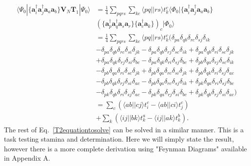 \documentclass[graybox,sectrefs,envcountresetchap,open=right]{svmonodo}
\begin{document}
\begin{align}
\langle \Psi_{0} | \{\mathbf{a}^{\dagger}_i \mathbf{a}^{\dagger}_j \mathbf{a}_a \mathbf{a}_b\}  \mathbf{V}_N \mathbf{T}_1 | \Psi_0 \rangle & = 
\frac{1}{4}
\sum_{pqrs}
\sum_{kc}
\langle pq|| rs \rangle t_k^c \langle \Phi_0 | \{
\mathbf{a}^{\dagger}_i
\mathbf{a}^{\dagger}_j
\mathbf{a}_a
\mathbf{a}_b \} \nonumber \\ & 
\left(
\{
\mathbf{a}^{\dagger}_p
\mathbf{a}^{\dagger}_q
\mathbf{a}_s
\mathbf{a}_r
\}
\{
\mathbf{a}^{\dagger}_c
\mathbf{a}_k
\}
\right)_c | \Phi_0 \rangle
\nonumber \\ & = 
\frac{1}{4} \sum_{pqrs} \sum_{kc} \langle pq||rs\rangle t_k^c ( \delta_{pa} \delta_{qb} \delta_{rc} \delta_{sj} \delta_{ik}  \nonumber \\ & 
- \delta_{pa} \delta_{qb} \delta_{rc} \delta_{si} \delta_{jk}
- \delta_{pa} \delta_{qb} \delta_{rj} \delta_{sc} \delta_{ik}
+ \delta_{pa} \delta_{qb} \delta_{ri} \delta_{sc} \delta_{jk}
\nonumber \\ & 
+ \delta_{pa} \delta_{qk} \delta_{rj} \delta_{si} \delta_{bc}
- \delta_{pa} \delta_{qk} \delta_{ri} \delta_{sj} \delta_{bc}
+ \delta_{pb} \delta_{qa} \delta_{rj} \delta_{sc} \delta_{ik}
 \nonumber \\ & 
- \delta_{pb} \delta_{qa} \delta_{ri} \delta_{sc} \delta_{jk}
+ \delta_{pb} \delta_{qa} \delta_{rc} \delta_{si} \delta_{jk} 
+ \delta_{pb} \delta_{qk} \delta_{ri} \delta_{sj} \delta_{ac} \nonumber \\ & 
- \delta_{pb} \delta_{qk} \delta_{rj} \delta_{si} \delta_{ac}
- \delta_{pb} \delta_{qa} \delta_{rc} \delta_{sj} \delta_{ik}
+ \delta_{pk} \delta_{qa} \delta_{ri} \delta_{sj} \delta_{bc} \nonumber \\ & 
- \delta_{pk} \delta_{qb} \delta_{ri} \delta_{sj} \delta_{ac}
- \delta_{pk} \delta_{qa} \delta_{rj} \delta_{si} \delta_{bc}
+ \delta_{pk} \delta_{qb} \delta_{rj} \delta_{si} \delta_{ac}) \nonumber \\ &
= \sum_c \left( \langle ab || cj \rangle t_i^c - \langle ab || ci \rangle t_j^c \right) \nonumber \\ & 
+ \sum_k \left( \langle ij || bk \rangle t_k^a - \langle ij||ak\rangle t_k^b \right) .
\end{align} 
The rest of Eq.~\ref{T2equationtosolve} can be solved in a similar manner. This is a task testing stamina and determination. Here we will simply state the result, however there is a more complete derivation using "Feynman Diagrams" available in Appendix A. \\
\end{document}
